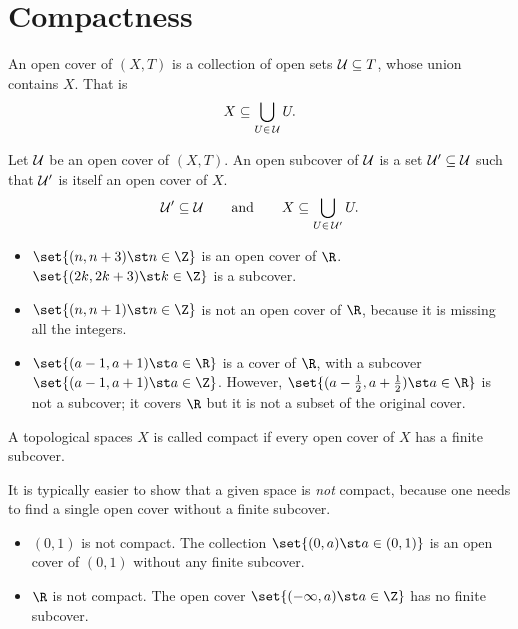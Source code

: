 \section{Compactness}
\begin{ndfn}
  An open cover of $(X,T)$ is a collection of open sets $\mathcal{U} \subseteq T$, whose union contains $X$. That is
  \begin{equation*}
    X \subseteq \bigcup_{U \in\,\mathcal{U}} U.
  \end{equation*}
\end{ndfn}

\begin{ndfn}[Subcover]
  Let $\mathcal{U}$ be an open cover of $(X,T)$. An open subcover of $\mathcal{U}$ is a set $\mathcal{U}' \subseteq \mathcal{U}$ such that $\mathcal{U}'$ is itself an open cover of $X$.
  \begin{equation*}
    \mathcal{U}' \subseteq \mathcal{U}
    \qquad\text{and}\qquad
    X \subseteq \bigcup_{U \in\,\mathcal{U}'} U.
  \end{equation*}
\end{ndfn}

\begin{negg}
  \phantom{}
  \begin{itemize}
  \item $\set{(n,n+3) \st n \in \Z}$ is an open cover of $\R$. $\set{(2k, 2k+3) \st k \in \Z}$ is a subcover.
  \item $\set{(n,n+1) \st n \in \Z}$ is not an open cover of $\R$, because it is missing all the integers.
  \item $\set{(a-1,a+1) \st a \in \R}$ is a cover of $\R$, with a subcover $\set{(a-1, a+1) \st a \in \Z}$. However, $\set{(a-\frac{1}{2}, a+\frac{1}{2}) \st a \in \R}$ is not a subcover; it covers $\R$ but it is not a subset of the original cover.
  \end{itemize}
\end{negg}

\begin{ndfn}[Compact]
  A topological spaces $X$ is called compact if every open cover of $X$ has a finite subcover.
\end{ndfn}

\begin{negg}
  It is typically easier to show that a given space is \emph{not} compact, because one needs to find a single open cover without a finite subcover.
  \begin{itemize}
  \item $(0,1)$ is not compact. The collection $\set{(0,a) \st a \in (0,1)}$ is an open cover of $(0,1)$ without any finite subcover.
  \item $\R$ is not compact. The open cover $\set{(-\infty, a) \st a \in \Z}$ has no finite subcover.
  \end{itemize}
\end{negg}

